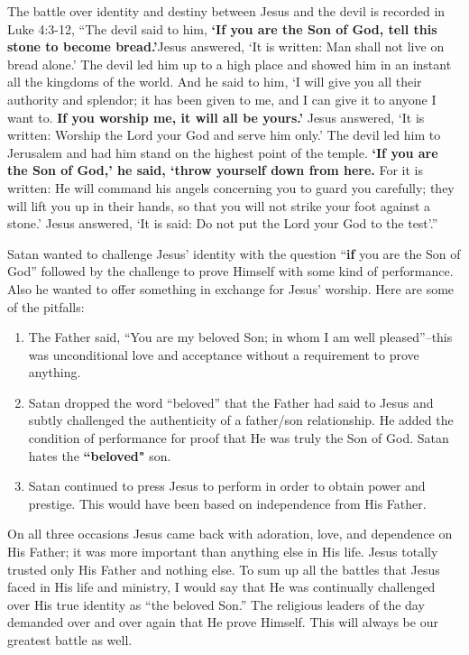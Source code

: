 \documentclass[twoside, 12pt]{book}
\begin{document}
The battle over identity and destiny between Jesus and the devil is recorded in Luke 4:3-12,  “The devil said to him, \textbf{`If you are the Son of God, tell this stone to become bread.'}Jesus answered, ‘It is written: Man shall not live on bread alone.’ The devil led him up to a high place and showed him in an instant all the kingdoms of the world.  And he said to him, ‘I will give you all their authority and splendor; it has been given to me, and I can give it to anyone I want to. \textbf{If you worship me, it will all be yours.'} Jesus answered, ‘It is written: Worship the Lord your God and serve him only.’ The devil led him to Jerusalem and had him stand on the highest point of the temple. \textbf{`If you are the Son of God,' he said, `throw yourself down from here.} For it is written: He will command his angels concerning you to guard you carefully; they will lift you up in their hands, so that you will not strike your foot against a stone.’ Jesus answered, ‘It is said: Do not put the Lord your God to the test’.”

Satan wanted to challenge Jesus’ identity with the question “\textbf{if} you are the Son of God” followed by the challenge to prove Himself with some kind of performance. Also he wanted to offer something in exchange for Jesus’ worship. Here are some of the pitfalls:

\begin{enumerate}
	\item The Father said, “You are my beloved Son; in whom I am well pleased”--this was unconditional love and acceptance without a requirement to prove anything.
	\item Satan dropped the word “beloved” that the Father had said to Jesus and subtly challenged the authenticity of a father/son relationship. He added the condition of performance for proof that He was truly the Son of God. Satan hates the \textbf{``beloved"} son.
	\item Satan continued to press Jesus to perform in order to obtain power and prestige. This would have been based on independence from His Father.
\end{enumerate}

On all three occasions Jesus came back with adoration, love, and dependence on His Father; it was more important than anything else in His life. Jesus totally trusted only His Father and nothing else. To sum up all the battles that Jesus faced in His life and ministry, I would say that He was continually challenged over His true identity as “the beloved Son.” The religious leaders of the day demanded over and over again that He prove Himself. This will always be our greatest battle as well. 
\end{document}

